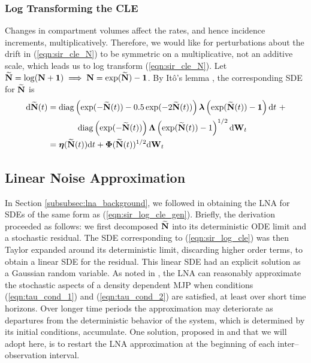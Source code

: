 \subsubsection{Log Transforming the CLE}
\label{subsubsec:log_cle}
Changes in compartment volumes affect the rates, and hence incidence increments, multiplicatively. Therefore, we would like for perturbations about the drift in (\ref{eqn:sir_cle_N}) to be symmetric on a multiplicative, not an additive scale, which leads us to log transform (\ref{eqn:sir_cle_N}). Let $ \widetilde{\mathbf{N}} = \log(\mathbf{N} + \boldsymbol{1}) \implies\mathbf{N} = \exp(\widetilde{\mathbf{N}}) - \boldsymbol{1}$. By It\^{o}'s lemma \cite{oksendal2003stochastic}, the corresponding SDE for $ \widetilde{\mathbf{N}} $ is 
\begin{align}
	\label{eqn:sir_log_cle}
	\mathrm{d}\widetilde{\mathbf{N}}(t) &= \mathrm{diag}\left (\exp(-\widetilde{\mathbf{N}}(t)) - 0.5\exp(-2\widetilde{\mathbf{N}}(t))\right )\boldsymbol{\lambda}\left (\exp(\widetilde{\mathbf{N}}(t))-\boldsymbol{1}\right )\mathrm{d} t\ + \nonumber\\
	& \hspace{0.5in} \mathrm{diag}\left (\exp(-\widetilde{\mathbf{N}}(t))\right )\boldsymbol{\Lambda}\left (\exp(\widetilde{\mathbf{N}}(t))-1\right )^{1/2}\mathrm{d}\mathbf{W}_t \\
	\label{eqn:sir_log_cle_gen}
	&= \boldsymbol{\eta}(\widetilde{\mathbf{N}}(t))\mathrm{d} t + \boldsymbol{\Phi}(\widetilde{\mathbf{N}}(t))^{1/2}\mathrm{d}\mathbf{W}_t
\end{align}

\subsection{Linear Noise Approximation}
\label{subsec:sir_lna}

In Section \ref{subsubsec:lna_background}, we followed \cite{fearnhead2014,golightly2013simulation} in obtaining the LNA for SDEs of the same form as (\ref{eqn:sir_log_cle_gen}). Briefly, the derivation proceeded as follows: we first decomposed $ \widetilde{\mathbf{N}} $ into its deterministic ODE limit and a stochastic residual. The SDE corresponding to (\ref{eqn:sir_log_cle}) was then Taylor expanded around its deterministic limit, discarding higher order terms, to obtain a linear SDE for the residual. This linear SDE had an explicit solution as a Gaussian random variable. As noted in \cite{wallace2012linear}, the LNA can reasonably approximate the stochastic aspects of a density dependent MJP when conditions (\ref{eqn:tau_cond_1}) and (\ref{eqn:tau_cond_2}) are satisfied, at least over short time horizons. Over longer time periods the approximation may deteriorate as departures from the deterministic behavior of the system, which is determined by its initial conditions, accumulate.  One solution, proposed in \cite{fearnhead2014,minas2017long} and that we will adopt here, is to restart the LNA approximation at the beginning of each inter--observation interval. 

